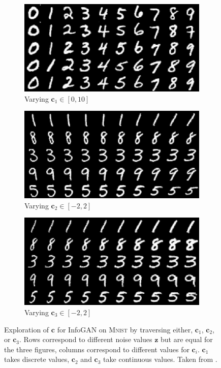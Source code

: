 \begin{figure}
    \centering
    \begin{subfigure}{.33\textwidth}
        \centering
        \includegraphics[width=.8\textwidth]{images/infogan_c1.png}
        \caption{Varying $\bm{c}_1 \in [0, 10]$}
    \end{subfigure}%
    \begin{subfigure}{.33\textwidth}
        \centering
        \includegraphics[width=.8\textwidth]{images/infogan_c2.png}
        \caption{Varying $\bm{c}_2 \in [-2, 2]$}
    \end{subfigure}
    \begin{subfigure}{.33\textwidth}
        \centering
        \includegraphics[width=.8\textwidth]{images/infogan_c3.png}
        \caption{Varying $\bm{c}_3 \in [-2, 2]$}
    \end{subfigure}
    \caption[InfoGAN latent space traversal]{Exploration of $\bm{c}$ for InfoGAN on \textsc{Mnist} by traversing either, $\bm{c}_1$, $\bm{c}_2$, or $\bm{c}_3$. Rows correspond to different noise values $\bm{z}$ but are equal for the three figures, columns correspond to different values for $\bm{c}_i$. $\bm{c}_1$ takes discrete values, $\bm{c}_2$ and $\bm{c}_3$ take continuous values. Taken from \citet{chen2016infogan}.}
    \label{fig:infogan}
\end{figure}

